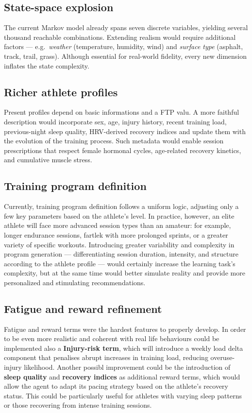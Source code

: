 
\subsection{State-space explosion}
The current Markov model already spans seven discrete variables, yielding several thousand reachable combinations.  Extending realism would require additional factors — e.g.\ \emph{weather} (temperature, humidity, wind) and \emph{surface type} (asphalt, track, trail, grass). Although essential for real-world fidelity, every new dimension inflates the state complexity.

\subsection{Richer athlete profiles}
Present profiles depend on basic informations and a FTP valu. A more faithful description would incorporate sex, age, injury history, recent training load, previous-night sleep quality, HRV-derived recovery indices and update them with the evolution of the training process. 
Such metadata would enable session prescriptions that respect female hormonal cycles, age-related recovery kinetics, and cumulative muscle stress.

\subsection{Training program definition}
Currently, training program definition follows a uniform logic, adjusting only a few key parameters based on the athlete's level. In practice, however, an elite athlete will face more advanced session types than an amateur: for example, longer endurance sessions, fartlek with more prolonged sprints, or a greater variety of specific workouts. Introducing greater variability and complexity in program generation — differentiating session duration, intensity, and structure according to the athlete profile — would certainly increase the learning task's complexity, but at the same time would better simulate reality and provide more personalized and stimulating recommendations.

\subsection{Fatigue and reward refinement}
Fatigue and reward terms were the hardest features to properly develop. In order to be even more realistic and coherent with real life behaviours could be implemented also a \textbf{Injury-risk term}, which will introduce a weekly load delta component that penalises abrupt increases in training load, reducing overuse-injury likelihood.
Another possibl improvement could be the introduction of \textbf{sleep quality} and \textbf{recovery indices} as additional reward terms, which would allow the agent to adapt its pacing strategy based on the athlete's recovery status. This could be particularly useful for athletes with varying sleep patterns or those recovering from intense training sessions.

